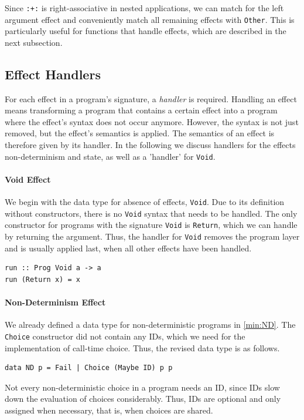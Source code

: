 \documentclass[a4paper, 11pt, fleqn, twoside]{scrreprt}
\newcommand{\hinl}[1]{\texttt{#1}}
\begin{document}
Since \hinl{:+:} is right-associative in nested applications, we can match for the left argument effect and conveniently match all remaining effects with \hinl{Other}.
This is particularly useful for functions that handle effects, which are described in the next subsection.


\subsection{Effect Handlers}
\label{subsec:effectHandlers}
For each effect in a program's signature, a \textit{handler} is required.
Handling an effect means transforming a program that contains a certain effect into a program where the effect's syntax does not occur anymore.
However, the syntax is not just removed, but the effect's semantics is applied.
The semantics of an effect is therefore given by its handler.
In the following we discuss handlers for the effects non-determinism and state, as well as a 'handler' for \hinl{Void}.

\paragraph{Void Effect}
We begin with the data type for absence of effects, \hinl{Void}.
Due to its definition without constructors, there is no \hinl{Void} syntax that needs to be handled.
The only constructor for programs with the signature \hinl{Void} is \hinl{Return}, which we can handle by returning the argument.
Thus, the handler for \hinl{Void} removes the program layer and is usually applied last, when all other effects have been handled.

\begin{verbatim}
run :: Prog Void a -> a
run (Return x) = x
\end{verbatim}

\paragraph{Non-Determinism Effect}
We already defined a data type for non-deterministic programs in \autoref{min:ND}.
The \hinl{Choice} constructor did not contain any IDs, which we need for the implementation of call-time choice.
Thus, the revised data type is as follows.

\begin{verbatim}
data ND p = Fail | Choice (Maybe ID) p p
\end{verbatim}

Not every non-deterministic choice in a program needs an ID, since IDs slow down the evaluation of choices considerably.
Thus, IDs are optional and only assigned when necessary, that is, when choices are shared.
\end{document}
